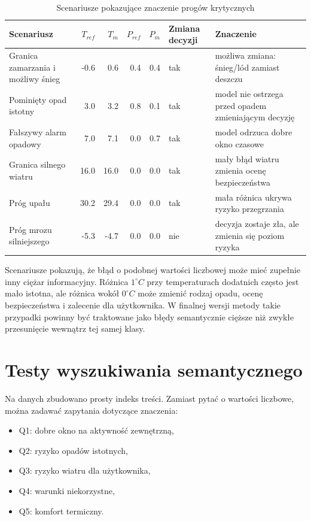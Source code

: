 \documentclass[a4paper,12pt]{article}
\begin{document}
\begin{table}[h]
\centering
\caption{Scenariusze pokazujące znaczenie progów krytycznych}
\begin{tabular}{p{4.2cm}rrrrp{4.1cm}}
\toprule
Scenariusz & \(T_{ref}\) & \(T_m\) & \(P_{ref}\) & \(P_m\) & Zmiana decyzji & Znaczenie \\
\midrule
Granica zamarzania i możliwy śnieg & -0.6 & 0.6 & 0.4 & 0.4 & tak & możliwa zmiana: śnieg/lód zamiast deszczu \\
Pominięty opad istotny & 3.0 & 3.2 & 0.8 & 0.1 & tak & model nie ostrzega przed opadem zmieniającym decyzję \\
Fałszywy alarm opadowy & 7.0 & 7.1 & 0.0 & 0.7 & tak & model odrzuca dobre okno czasowe \\
Granica silnego wiatru & 16.0 & 16.0 & 0.0 & 0.0 & tak & mały błąd wiatru zmienia ocenę bezpieczeństwa \\
Próg upału & 30.2 & 29.4 & 0.0 & 0.0 & tak & mała różnica ukrywa ryzyko przegrzania \\
Próg mrozu silniejszego & -5.3 & -4.7 & 0.0 & 0.0 & nie & decyzja zostaje zła, ale zmienia się poziom ryzyka \\
\bottomrule
\end{tabular}
\end{table}

\noindent
Scenariusze pokazują, że błąd o podobnej wartości liczbowej może mieć zupełnie
inny ciężar informacyjny. Różnica \(1^\circ C\) przy temperaturach dodatnich
często jest mało istotna, ale różnica wokół \(0^\circ C\) może zmienić rodzaj
opadu, ocenę bezpieczeństwa i zalecenie dla użytkownika. W finalnej wersji
metody takie przypadki powinny być traktowane jako błędy semantycznie cięższe
niż zwykłe przesunięcie wewnątrz tej samej klasy.

\section{Testy wyszukiwania semantycznego}

Na danych zbudowano prosty indeks treści. Zamiast pytać o wartości liczbowe,
można zadawać zapytania dotyczące znaczenia:
\begin{itemize}
    \item Q1: dobre okno na aktywność zewnętrzną,
    \item Q2: ryzyko opadów istotnych,
    \item Q3: ryzyko wiatru dla użytkownika,
    \item Q4: warunki niekorzystne,
    \item Q5: komfort termiczny.
\end{itemize}
\end{document}

